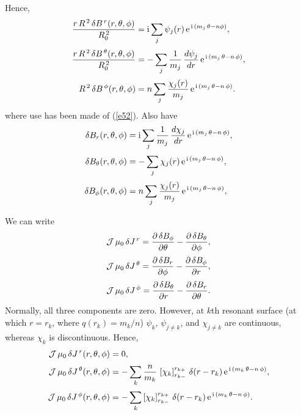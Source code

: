 \documentclass[notitlepage,12pt]{article}
\begin{document}
Hence,
\begin{align}
\frac{r\,R^{\,2}\,\delta B^{\,r}(r,\theta,\phi)}{R_0^{\,2}}&= {\rm i}\sum_j \psi_j(r)\,{\rm e}^{\,{\rm i}\,(m_j\,\theta-n\phi)},\label{e86}\\[0.5ex]
\frac{r\,R^{\,2}\,\delta B^{\,\theta}(r,\theta,\phi)}{R_0^{\,2}}&=- \sum_j \frac{1}{m_j}\,\frac{d\psi_j}{dr}\,{\rm e}^{\,{\rm i}\,(m_j\,\theta-n\,\phi)},\label{e90}\\[0.5ex]
R^{\,2}\,\delta B^{\,\phi}(r,\theta,\phi)&= n\sum_j\frac{\chi_j(r)}{m_j}\,{\rm e}^{\,{\rm i}\,(m_j\,\theta-n\,\phi)}.\label{e91}
\end{align}
where use has been made of (\ref{e52}). Also have
\begin{align}
\delta B_r(r,\theta,\phi)&= {\rm i}\sum_j \frac{1}{m_j}\,\frac{d\chi_j}{dr}\,{\rm e}^{\,{\rm i}\,(m_j\,\theta-n\,\phi)},\\[0.5ex]
\delta B_\theta (r,\theta,\phi)&=-\sum_j\chi_j(r)\,{\rm e}^{\,{\rm i}\,(m_j\,\theta-n\,\phi)},\\[0.5ex]
\delta B_\phi(r,\theta,\phi)&=n\sum_j\frac{\chi_j(r)}{m_j}\,{\rm e}^{\,{\rm i}\,(m_j\,\theta-n\,\phi)},
\end{align}

We can write
\begin{align}
{\cal J}\,\mu_0\,\delta J^{\,r} = \frac{\partial\,\delta B_\phi}{\partial\theta} -\frac{\partial \,\delta B_\theta}{\partial\phi},\\[0.5ex]
{\cal J}\,\mu_0\,\delta J^{\,\theta} = \frac{\partial\,\delta B_r}{\partial\phi} -\frac{\partial \,\delta B_\phi}{\partial r},\\[0.5ex]
{\cal J}\,\mu_0\,\delta J^{\,\phi} = \frac{\partial\,\delta B_\theta}{\partial r} -\frac{\partial \,\delta B_r}{\partial\theta}.
\end{align}
Normally, all three components are zero. However, at $k$th resonant 
surface (at which $r=r_k$, where $q(r_k)=m_k/n$) $\psi_k$, $\psi_{j\neq k}$, and $\chi_{j\neq k}$ are continuous, whereas $\chi_k$ is discontinuous. Hence,
\begin{align}
{\cal J}\,\mu_0\,\delta J^{\,r}(r,\theta,\phi) &= 0,\\[0.5ex]
{\cal J}\,\mu_0\,\delta J^{\,\theta}(r,\theta,\phi) &=-\sum_k \frac{n}{m_k}\,\left[\chi_k
\right]_{r_{k-}}^{r_{k+}}\,\delta(r-r_k)\,{\rm e}^{\,{\rm i}\,(m_k\,\theta-n\,\phi)},\\[0.5ex]
{\cal J}\,\mu_0\,\delta J^{\,\phi}(r,\theta,\phi) &=-\sum_k \left[\chi_k\right]_{r_{k-}}^{r_{k+}}\,\delta(r-r_k)\,{\rm e}^{\,{\rm i}\,(m_k\,\theta-n\,\phi)}.\label{e97}
\end{align}
\end{document}
